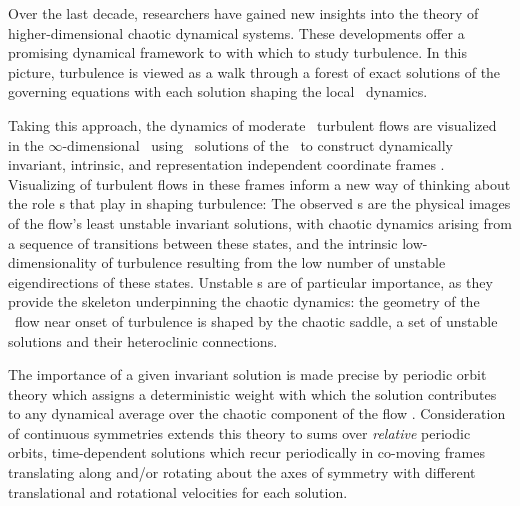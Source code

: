Over the last decade, researchers have gained new insights into the theory of higher-dimensional chaotic dynamical systems. These developments offer a promising dynamical framework to with which to study turbulence. In this picture, turbulence is viewed as a walk through a forest of exact solutions of the governing equations with each solution shaping the local \statesp\ dynamics. 


Taking this approach, the dynamics of moderate \Reynolds\ turbulent flows are
visualized in the $\infty$-dimensional \stateDsp\  using \eqv\ solutions
of the \NSe\ to construct dynamically invariant, intrinsic, and
representation independent coordinate frames . Visualizing of turbulent flows in these frames inform a new way of thinking about the role {\recurrStr s}
that play in shaping turbulence: The observed {\cohStr s} are the physical images of the flow's least unstable invariant solutions, with chaotic dynamics arising from a sequence of transitions between these states, and the intrinsic low-dimensionality of turbulence resulting from the low number of unstable eigendirections of these states.
Unstable \po s are of particular importance, as they provide the skeleton underpinning the chaotic dynamics: the geometry of the \statesp\ flow
near onset of turbulence is shaped by the chaotic saddle, a set of unstable solutions and their heteroclinic connections.

The importance of a given invariant solution is made precise by periodic
orbit theory which assigns a deterministic weight with which the solution
contributes to any dynamical average over the chaotic component of the flow
. Consideration of continuous symmetries extends this
theory to sums over \emph{relative} periodic orbits, time-dependent solutions which recur periodically in co-moving frames translating along and/or rotating about the axes of symmetry with different translational and rotational velocities for each solution.

